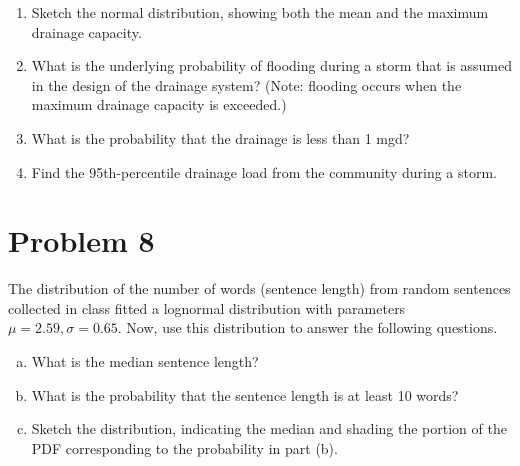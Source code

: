\documentclass[12pt,twoside]{article}
\newcommand{\pts}[1]{\marginpar{ \small\hspace{0pt} \textit{[#1]} } }
\newcommand{\?}{\stackrel{?}{=}}
\begin{document}
\begin{enumerate}[\bf (a)]
\item Sketch the normal distribution, showing both the mean and the maximum drainage capacity. \pts{3}
  \vspace{20ex}

\item  What is the underlying probability of flooding during a storm that is assumed \pts{2}
in the design of the drainage system? (Note: flooding occurs when the maximum drainage capacity is exceeded.)
\vspace{20ex}

\item What is the probability that the drainage is less than 1 mgd? \pts{2}
  \vspace{25ex}


  \item  Find the 95th-percentile drainage load from the community during a storm. \pts{2}
  \vspace{30ex}


\end{enumerate}




\eject
\section*{Problem 8 }
The distribution of the number of words (sentence length) from random sentences collected in class 
fitted a lognormal distribution with parameters $\mu = 2.59, \sigma = 0.65$. 
Now, use this distribution to answer the following questions.

\begin{enumerate}[(a)]
  \item  What is the median sentence length? \pts{2}
  \vspace{15ex}


\item What is the probability that the sentence length  is at least 10 words? \pts{3}
  \vspace{30ex}

\item Sketch the distribution, indicating the median and shading the portion of 
the PDF corresponding to the probability in part (b). \pts{3}
  
\end{enumerate}

\eject
\end{document}
